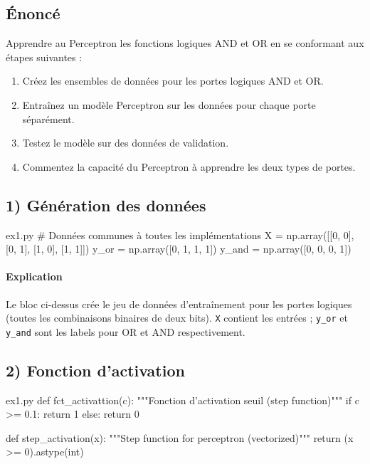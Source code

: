 \documentclass[12pt,a4paper]{article}
\begin{document}
\subsection*{Énoncé}
Apprendre au Perceptron les fonctions logiques AND et OR en se
conformant aux étapes suivantes :
\begin{enumerate}
    \item Créez les ensembles de données pour les portes logiques AND et OR.
    \item Entraînez un modèle Perceptron sur les données pour chaque porte séparément.
    \item Testez le modèle sur des données de validation.
    \item Commentez la capacité du Perceptron à apprendre les deux types de portes.
\end{enumerate}

\subsection*{1) Génération des données}

\begin{codeholder}{ex1.py}
# Données communes à toutes les implémentations
X = np.array([[0, 0], [0, 1], [1, 0], [1, 1]])
y_or = np.array([0, 1, 1, 1])
y_and = np.array([0, 0, 0, 1])
\end{codeholder}

\paragraph{Explication}
Le bloc ci-dessus crée le jeu de données d'entraînement pour les portes
logiques (toutes les combinaisons binaires de deux bits).
\texttt{X} contient les entrées ; \texttt{y\_or} et \texttt{y\_and}
sont les labels pour OR et AND respectivement.


\subsection*{2) Fonction d'activation}

\begin{codeholder}{ex1.py}
def fct_activattion(c):
    """Fonction d'activation seuil (step function)"""
    if c >= 0.1:
        return 1
    else:
        return 0

def step_activation(x):
    """Step function for perceptron (vectorized)"""
    return (x >= 0).astype(int)
\end{codeholder}
\end{document}
